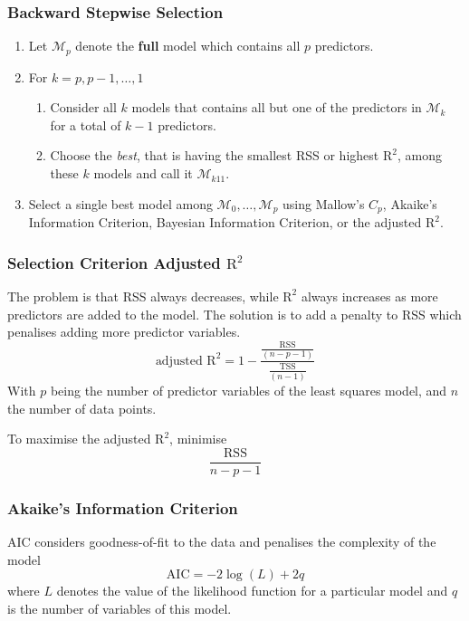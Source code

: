 \documentclass[11pt]{article}
\begin{document}
\subsubsection{Backward Stepwise Selection}
\begin{enumerate}
	\item Let $\mathcal{M}_p$ denote the \textbf{full} model which contains all $p$ predictors.
	\item For $k = p, p-1, \dots, 1$
	\begin{enumerate}
		\item Consider all $k$ models that contains all but one of the predictors in $\mathcal{M}_k$ for a total of $k-1$ predictors.
		\item Choose the \emph{best}, that is having the smallest RSS or highest $\text{R}^2$, among these $k$ models and call it $\mathcal{M}_{k11}$.
	\end{enumerate}
	\item Select a single best model among $\mathcal{M}_0,\dots, \mathcal{M}_p$ using Mallow's $C_p$, Akaike's Information Criterion, Bayesian Information Criterion, or the adjusted $\text{R}^2$.
\end{enumerate}

\subsubsection{Selection Criterion Adjusted $\text{R}^2$}
The problem is that RSS always decreases, while $\text{R}^2$ always increases as more predictors are added to the model. The solution is to add a penalty to RSS which penalises adding more predictor variables.
\begin{equation*}
	\text{adjusted R}^2 = 1 - \frac{\frac{\text{RSS}}{(n-p-1)}}{\frac{\text{TSS}}{(n-1)}}
\end{equation*}
With $p$ being the number of predictor variables of the least squares model, and $n$ the number of data points.

To maximise the adjusted $\text{R}^2$, minimise
\begin{equation*}
	\frac{\text{RSS}}{n-p-1}
\end{equation*}

\subsubsection{Akaike's Information Criterion}
AIC considers goodness-of-fit to the data and penalises the complexity of the model
\begin{equation*}
	\text{AIC} = -2\log(L) + 2q
\end{equation*}
where $L$ denotes the value of the likelihood function for a particular model and $q$ is the number of variables of this model.
\end{document}
